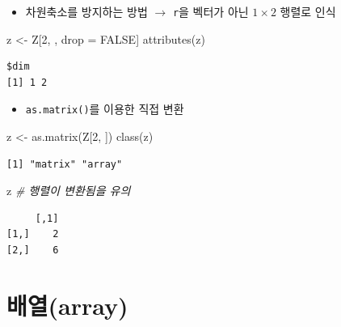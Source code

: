 \documentclass[
  11pt,
]{krantz}
\newenvironment{Shaded}{\begin{snugshade}}{\end{snugshade}}
\newcommand{\CommentTok}[1]{\textcolor[rgb]{0.37,0.37,0.37}{\textit{#1}}}
\newcommand{\ConstantTok}[1]{\textcolor[rgb]{0,0,0}{#1}}
\newcommand{\DecValTok}[1]{\textcolor[rgb]{0.06,0.06,0.06}{#1}}
\newcommand{\FunctionTok}[1]{\textcolor[rgb]{0,0,0}{#1}}
\newcommand{\NormalTok}[1]{#1}
\newcommand{\OtherTok}[1]{\textcolor[rgb]{0.37,0.37,0.37}{#1}}
\providecommand{\tightlist}{%
  \setlength{\itemsep}{0pt}\setlength{\parskip}{0pt}}
\begin{document}
\normalsize

\begin{itemize}
\tightlist
\item
  차원축소를 방지하는 방법 \(\rightarrow\) \texttt{r}을 벡터가 아닌 \(1 \times 2\) 행렬로 인식
\end{itemize}

\footnotesize

\begin{Shaded}
\begin{Highlighting}[]
\NormalTok{z }\OtherTok{\textless{}{-}}\NormalTok{ Z[}\DecValTok{2}\NormalTok{, , drop }\OtherTok{=} \ConstantTok{FALSE}\NormalTok{]}
\FunctionTok{attributes}\NormalTok{(z)}
\end{Highlighting}
\end{Shaded}

\begin{verbatim}
$dim
[1] 1 2
\end{verbatim}

\normalsize

\begin{itemize}
\tightlist
\item
  \texttt{as.matrix()}를 이용한 직접 변환
\end{itemize}

\footnotesize

\begin{Shaded}
\begin{Highlighting}[]
\NormalTok{z }\OtherTok{\textless{}{-}} \FunctionTok{as.matrix}\NormalTok{(Z[}\DecValTok{2}\NormalTok{, ])}
\FunctionTok{class}\NormalTok{(z)}
\end{Highlighting}
\end{Shaded}

\begin{verbatim}
[1] "matrix" "array" 
\end{verbatim}

\begin{Shaded}
\begin{Highlighting}[]
\NormalTok{z }\CommentTok{\# 행렬이 변환됨을 유의}
\end{Highlighting}
\end{Shaded}

\begin{verbatim}
     [,1]
[1,]    2
[2,]    6
\end{verbatim}

\normalsize

\hypertarget{array}{%
\section{배열(array)}\label{array}}
\end{document}
